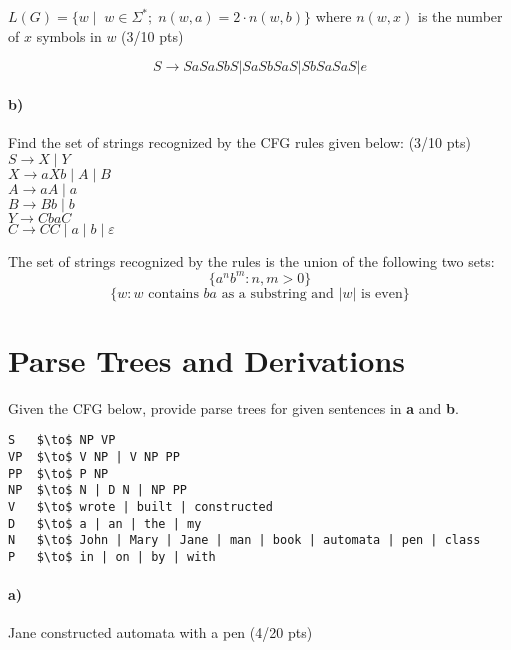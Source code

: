 \documentclass[a4paper,12pt]{article}
\begin{document}
$L(G)=\{w \mid \;  w \in \Sigma^*;\; n(w,a)=2\cdot n(w,b)\}$ where $n(w,x)$ is the number of $x$ symbols in $w$ \hfill \small{(3/10 pts)} \\
\begin{tcolorbox}
\[
    S  \rightarrow SaSaSbS|SaSbSaS|SbSaSaS|e
\]
\end{tcolorbox}

\paragraph{b)} Find the set of strings recognized by the CFG rules given below:         \hfill \small{(3/10 pts)} \\


$S \to X \mid Y$ \\
$X \to aXb \mid A \mid B$ \\
$A \to aA \mid a$ \\
$B \to Bb \mid b$ \\
$Y \to CbaC$ \\
$C \to CC \mid a \mid b \mid \varepsilon$  \\

\begin{tcolorbox}
The set of strings recognized by the rules is the union of the following two sets:\\
\[
\{a^nb^m : n,m > 0\}
\]
\[
\{w : w \text{ contains }ba\text{ as a substring and } |w|\text{ is even}\}
\]
\end{tcolorbox}


\newpage
\section{Parse Trees and Derivations \hfill {}}
Given the CFG below, provide parse trees for given sentences in \textbf{a} and \textbf{b}.\\

\begin{lstlisting}[style=output,mathescape=true]
S   $\to$ NP VP
VP  $\to$ V NP | V NP PP
PP  $\to$ P NP
NP  $\to$ N | D N | NP PP
V   $\to$ wrote | built | constructed
D   $\to$ a | an | the | my
N   $\to$ John | Mary | Jane | man | book | automata | pen | class
P   $\to$ in | on | by | with
\end{lstlisting}

\paragraph{a)} Jane constructed automata with a pen \hfill \small{(4/20 pts)} \\
\end{document}
